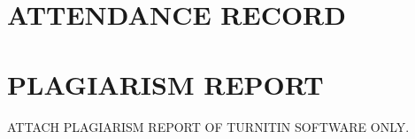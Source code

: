 \chapter*{ATTENDANCE RECORD }
\thispagestyle{fancy}

\chapter*{PLAGIARISM REPORT}

ATTACH PLAGIARISM REPORT OF TURNITIN SOFTWARE ONLY. 